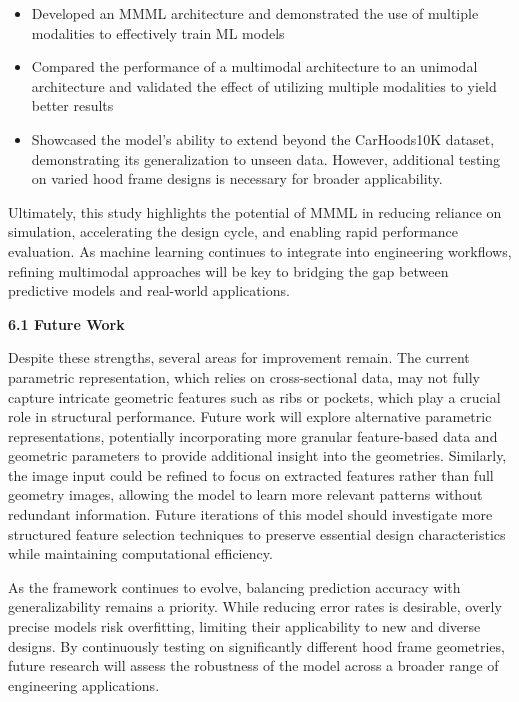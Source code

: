 \documentclass[11pt]{article}
\begin{document}
\begin{itemize}
\item
  Developed an MMML architecture and demonstrated the use of multiple
  modalities to effectively train ML models
\item
  Compared the performance of a multimodal architecture to an unimodal
  architecture and validated the effect of utilizing multiple modalities
  to yield better results
\item
  Showcased the model's ability to extend beyond the CarHoods10K
  dataset, demonstrating its generalization to unseen data. However,
  additional testing on varied hood frame designs is necessary for
  broader applicability.
\end{itemize}

Ultimately, this study highlights the potential of MMML in reducing
reliance on simulation, accelerating the design cycle, and enabling
rapid performance evaluation. As machine learning continues to integrate
into engineering workflows, refining multimodal approaches will be key
to bridging the gap between predictive models and real-world
applications.

\textbf{6.1 Future Work}

Despite these strengths, several areas for improvement remain. The
current parametric representation, which relies on cross-sectional data,
may not fully capture intricate geometric features such as ribs or
pockets, which play a crucial role in structural performance. Future
work will explore alternative parametric representations, potentially
incorporating more granular feature-based data and geometric parameters
to provide additional insight into the geometries. Similarly, the image
input could be refined to focus on extracted features rather than full
geometry images, allowing the model to learn more relevant patterns
without redundant information. Future iterations of this model should
investigate more structured feature selection techniques to preserve
essential design characteristics while maintaining computational
efficiency.

As the framework continues to evolve, balancing prediction accuracy with
generalizability remains a priority. While reducing error rates is
desirable, overly precise models risk overfitting, limiting their
applicability to new and diverse designs. By continuously testing on
significantly different hood frame geometries, future research will
assess the robustness of the model across a broader range of engineering
applications.
\end{document}
